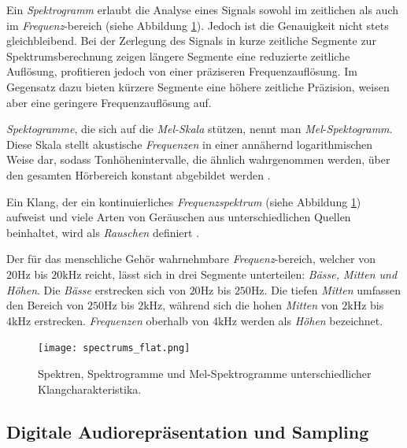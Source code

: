 \documentclass[
  a4paper,  %
  twoside,  %
  bibliography=totoc,
  headsepline,
  cleardoublepage=empty,
  parskip=half,
  draft=false
]{scrbook}
\begin{document}
Ein \emph{Spektrogramm} erlaubt die Analyse eines Signals sowohl im zeitlichen als auch im \emph{Frequenz}-bereich (siehe Abbildung \ref{fig:spectro}). Jedoch ist die Genauigkeit nicht stets gleichbleibend. Bei der Zerlegung des Signals in kurze zeitliche Segmente zur Spektrumsberechnung zeigen längere Segmente eine reduzierte zeitliche Auflösung, profitieren jedoch von einer präziseren Frequenzauflösung. Im Gegensatz dazu bieten kürzere Segmente eine höhere zeitliche Präzision, weisen aber eine geringere Frequenzauflösung auf. \cite{raffaseder_audiodesign_2010}

\emph{Spektogramme}, die sich auf die \emph{Mel-Skala} stützen, nennt man \emph{Mel}-\emph{Spektogramm}. Diese Skala stellt akustische \emph{Frequenzen} in einer annähernd logarithmischen Weise dar, sodass Tonhöhenintervalle, die ähnlich wahrgenommen werden, über den gesamten Hörbereich konstant abgebildet werden \cite{noauthor_librosamel_frequencies_nodate}.

Ein Klang, der ein kontinuierliches \emph{Frequenzspektrum} (siehe Abbildung \ref{fig:spectro}) aufweist und viele Arten von Geräuschen aus unterschiedlichen Quellen beinhaltet, wird als \emph{Rauschen} definiert \cite{tsuji_physics_2021}.

Der für das menschliche Gehör wahrnehmbare \emph{Frequenz}-bereich, welcher von $20\text{Hz}$ bis $20\text{kHz}$ reicht, lässt sich in drei Segmente unterteilen: \emph{Bässe, Mitten und Höhen}. Die \emph{Bässe} erstrecken sich von $20\text{Hz}$ bis $250\text{Hz}$. Die tiefen \emph{Mitten} umfassen den Bereich von $250\text{Hz}$ bis $2\text{kHz}$, während sich die hohen \emph{Mitten} von $2\text{kHz}$ bis $4\text{kHz}$ erstrecken. \emph{Frequenzen} oberhalb von $4\text{kHz}$ werden als \emph{Höhen} bezeichnet. \cite{raffaseder_audiodesign_2010}

\begin{figure}
  \centering
  \texttt{[image: spectrums\_flat.png]}
  \caption[\emph{Spektren}, \emph{Spektrogramme} und \emph{Mel-Spektrogramme}]{Spektren, Spektrogramme und Mel-Spektrogramme unterschiedlicher Klangcharakteristika.}
  \label{fig:spectro}
\end{figure}


\subsection{Digitale Audiorepräsentation und Sampling}
\end{document}
